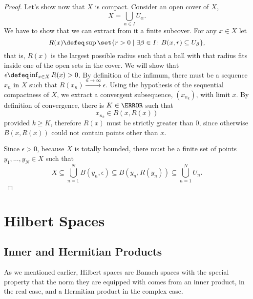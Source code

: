 \documentclass[12pt,oneside]{book}
\begin{document}
\begin{proof}
	Let's show now that \( X \) is compact. Consider an open cover of \( X \),
	\begin{equation*}
		X = \bigcup_{\alpha \in I} U_\alpha.
	\end{equation*}
	We have to show that we can extract from it a finite subcover. For any \( x \in X \) let 
	\begin{equation*}
		R(x) \defeq \sup \set{r > 0 \mid \exists \beta \in I \colon B(x,r) \subseteq
		U_\beta},
	\end{equation*}
	that is, \( R(x) \) is the largest possible radius such that a ball with that radius
	fits inside one of the open sets in the cover. We will show that \( \epsilon \defeq
	\inf_{x \in X} R(x) > 0 \). By definition of the infimum, there must be a sequence \( x_n
	\) in \( X \) such that \( R(x_n) \xrightarrow{n \to \infty} \epsilon \). Using the
	hypothesis of the sequential compactness of \( X \), we extract a convergent
	subsequence, \( (x_{n_k}) \), with limit \( x \). By definition of convergence, there is
	\( K \in \N \) such that
	\begin{equation*}
		x_{n_k} \in B(x, R(x))
	\end{equation*}
	provided \( k \geq K \), therefore \( R(x) \) must be strictly greater than 0, since
	otherwise \( B(x, R(x)) \) could not contain points other than \( x \). 


	Since \( \epsilon > 0 \), because \( X \) is totally bounded, there must be a finite set
	of points \( y_1, \dots, y_N \in X \) such that
	\begin{equation*}
		X \subseteq \bigcup_{n = 1}^N B(y_n, \epsilon) \subseteq B(y_n, R(y_n)) \subseteq
		\bigcup_{n = 1}^N U_n.
	\end{equation*}
\end{proof}

\part{Hilbert Spaces}
\chapter{Inner and Hermitian Products}
As we mentioned earlier, Hilbert spaces are Banach spaces with the special property that
the norm they are equipped with comes from an inner product, in the real case, and a
Hermitian product in the complex case.
\end{document}
